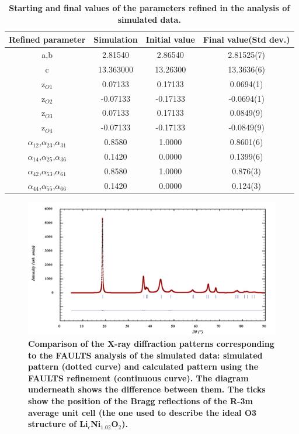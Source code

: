 \begin{table}
\begin{center}
\begin{tabular}{|c|c|c|c|}
\hline
Refined parameter & Simulation & Initial value & Final value(Std dev.)\\

\hline
a,b & 2.81540 & 2.86540 & 2.81525(7)\\
\hline
c & 13.363000 & 13.26300 & 13.3636(6)\\
\hline
z$_{O1}$ & 0.07133 & 0.17133 & 0.0694(1)\\
\hline
z$_{O2}$ & -0.07133 & -0.17133 & -0.0694(1)\\
\hline
z$_{O3}$ & 0.07133	&0.17133&	0.0849(9)\\
\hline
z$_{O4}$ & -0.07133	&-0.17133& -0.0849(9)\\
\hline
$\alpha_{12}$,$\alpha_{23}$,$\alpha_{31}$ & 0.8580&	1.0000	&0.8601(6)\\
\hline
$\alpha_{14}$,$\alpha_{25}$,$\alpha_{36}$ & 0.1420&	0.0000	&0.1399(6)\\
\hline
$\alpha_{42}$,$\alpha_{53}$,$\alpha_{61}$ & 0.8580&	1.0000	&0.876(3)\\
\hline
$\alpha_{44}$,$\alpha_{55}$,$\alpha_{66}$ & 0.1420&	0.0000	&0.124(3)\\
\hline


\end{tabular}
\caption{\textbf{Starting and final values of the parameters refined in the analysis of simulated data.}}
\label{taulasim}
\end{center}
\end{table}


\begin{figure}
\begin{center}
\includegraphics [width=6 in]{pattern.jpg}
\caption{\bf Comparison of the X-ray diffraction patterns corresponding to the FAULTS analysis of the simulated data: simulated pattern (dotted curve) and calculated pattern using the FAULTS refinement (continuous curve). The diagram underneath shows the difference between them. The ticks show the position of the Bragg reflections of the R-3m average unit cell (the one used to describe the ideal O3 structure of Li$_{\epsilon}$Ni$_{1.02}$O$_{2}$).  }
\label{sim}
\end{center}
\end{figure}

